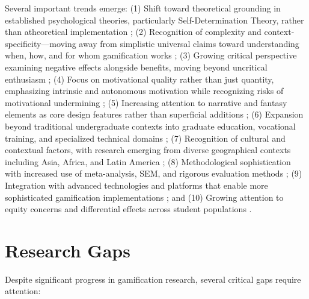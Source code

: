 \documentclass[12pt,a4paper]{article}
\begin{document}
Several important trends emerge: (1) Shift toward theoretical grounding in established psychological theories, particularly Self-Determination Theory, rather than atheoretical implementation \parencite{ryan2025,wu2024}; (2) Recognition of complexity and context-specificity—moving away from simplistic universal claims toward understanding when, how, and for whom gamification works \parencite{ryan2025,wu2024,dahri2024,ojonuba2023}; (3) Growing critical perspective examining negative effects alongside benefits, moving beyond uncritical enthusiasm \parencite{surendeleg2024}; (4) Focus on motivational quality rather than just quantity, emphasizing intrinsic and autonomous motivation while recognizing risks of motivational undermining \parencite{ryan2025,surendeleg2024}; (5) Increasing attention to narrative and fantasy elements as core design features rather than superficial additions \parencite{toda2022,wang2023,sevilla2024}; (6) Expansion beyond traditional undergraduate contexts into graduate education, vocational training, and specialized technical domains \parencite{sevilla2024,dahri2024,wang2023}; (7) Recognition of cultural and contextual factors, with research emerging from diverse geographical contexts including Asia, Africa, and Latin America \parencite{dahri2024,ojonuba2023,sevilla2024}; (8) Methodological sophistication with increased use of meta-analysis, SEM, and rigorous evaluation methods \parencite{wu2024,dahri2024,surendeleg2024}; (9) Integration with advanced technologies and platforms that enable more sophisticated gamification implementations \parencite{wang2023,rodriguez2025}; and (10) Growing attention to equity concerns and differential effects across student populations \parencite{surendeleg2024,ojonuba2023}.



\section{Research Gaps}
\label{sec:research-gaps}

Despite significant progress in gamification research, several critical gaps require attention:
\end{document}

